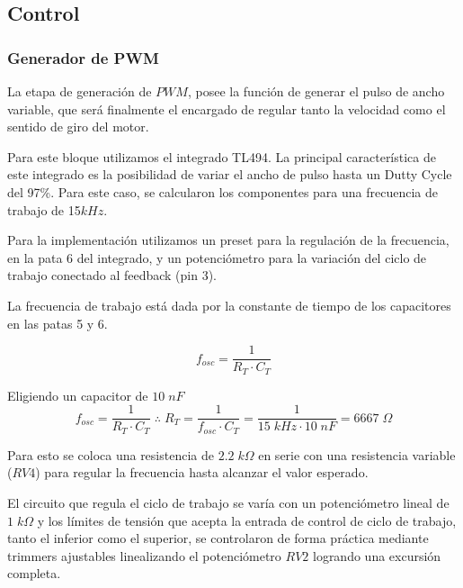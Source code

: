 \documentclass[11pt, a4paper]{article}
\begin{document}
\vfill
\subsection{Control}
\subsubsection{Generador de PWM}
La etapa de generación de $PWM$, posee la función de generar el pulso de ancho variable, que será finalmente
el encargado de regular tanto la velocidad como el sentido de giro del motor.

Para este bloque utilizamos el integrado TL494. La principal característica de este integrado es la posibilidad de variar el ancho de pulso hasta un Dutty Cycle del 97\%. Para este caso, se calcularon los componentes para una frecuencia de trabajo de 15$kHz$.

Para la implementación utilizamos un preset para la regulación de la frecuencia, en la pata 6 del integrado, y un potenciómetro para la variación del ciclo de trabajo conectado al feedback (pin 3).

La frecuencia de trabajo está dada por la constante de tiempo de los capacitores en las patas 5 y 6. 

\begin{equation}
f_{osc} = \frac{1}{R_T \cdot C_T} 
\end{equation}

Eligiendo un capacitor de $10 \; nF$
\begin{equation}
	f_{osc} = \frac{1}{R_T \cdot C_T} \; \therefore \; R_T = \frac{1}{f_{osc} \cdot C_T} = \frac{1}{15 \; kHz \cdot 10 \; nF} = 6667 \; \Omega 
\end{equation}

Para esto se coloca una resistencia de $2.2 \; k\Omega$ en serie con una resistencia variable ($RV4$) para regular la frecuencia hasta alcanzar el valor esperado.

El circuito que regula el ciclo de trabajo se varía con un potenciómetro lineal de $1 \; k\Omega$ y los límites de tensión que acepta la entrada de control de ciclo de trabajo, tanto el inferior como el superior, se controlaron de forma práctica mediante trimmers ajustables linealizando el potenciómetro $RV2$ logrando una excursión completa.
\end{document}
